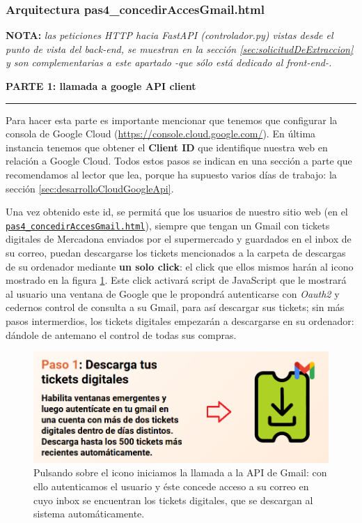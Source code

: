 \documentclass[a4paper,12pt]{report}
\begin{document}
	
	\subsubsection{Arquitectura pas4\_concedirAccesGmail.html}
	\label{sec:pas4googleAPIclient}
	
	
	\textbf{NOTA:} \textit{las peticiones HTTP hacia FastAPI (controlador.py) vistas desde el punto de vista del back-end, se muestran en la sección \ref{sec:solicitudDeExtraccion} y son complementarias a este apartado -que sólo está dedicado al front-end-.}
	
	
	
		
	\noindent \textbf{PARTE 1: llamada a google API client}
	\hrule
	\vspace{.5em}
	
	Para hacer esta parte es importante mencionar que tenemos que configurar la consola de Google Cloud (\href{https://console.cloud.google.com/}{https://console.cloud.google.com/}). En última instancia tenemos que obtener el \textbf{Client ID} que identifique nuestra web en relación a Google Cloud. Todos estos pasos se indican en una sección a parte que recomendamos al lector que lea, porque ha supuesto varios días de trabajo: la sección \ref{sec:desarrolloCloudGoogleApi}.
	
	Una vez obtenido este id, se permitá que los usuarios de nuestro sitio web (en el \href{https://github.com/blackcub3s/mercApp/blob/main/APP%20WEB/__frontend__produccio__/app/pas4_concedirAccesGmail.html}{\texttt{pas4\_concedirAccesGmail.html}}), siempre que tengan un Gmail con tickets digitales de Mercadona enviados por el supermercado y guardados en el inbox de su correo, puedan descargarse los tickets mencionados a la carpeta de descargas de su ordenador mediante \textbf{un solo click}: el click que ellos mismos harán al icono mostrado en la figura \ref{fig:pujarticketspas4}. Este click activará script de JavaScript que le mostrará al usuario una ventana de Google que le propondrá autenticarse con \textit{Oauth2} y cedernos control de consulta a su Gmail, para así descargar sus tickets; sin más pasos intermerdios, los tickets digitales empezarán a descargarse en su ordenador: dándole de antemano el control de todas sus compras.
	
	
	\begin{figure}[H]
		\centering
		\caption{Pulsando sobre el icono iniciamos la llamada a la API de Gmail: con ello autenticamos el usuario y éste concede acceso a su correo en cuyo inbox se encuentran los tickets digitales, que se descargan al sistema automáticamente.}
		\includegraphics[width=1\linewidth]{img/pujarTicketsPas4}

		\label{fig:pujarticketspas4}
	\end{figure}
	
\end{document}
